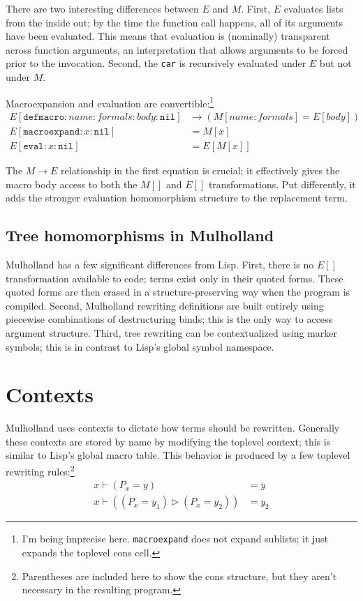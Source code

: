 \documentclass{report}
\begin{document}
    There are two interesting differences between $E$ and $M$. First, $E$ evaluates lists from the inside out; by the time the function call happens, all of its arguments have been evaluated.
    This means that evaluation is (nominally) transparent across function arguments, an interpretation that allows arguments to be forced prior to the invocation. Second, the {\tt car} is
    recursively evaluated under $E$ but not under $M$.

    Macroexpansion and evaluation are convertible:\footnote{I'm being imprecise here. {\tt macroexpand} does not expand sublists; it just expands the toplevel cons cell.}
\begin{align*}
E[\texttt{defmacro}:name:formals:body:\texttt{nil}] & \rightarrow (M[name:formals] = E[body]) \\
E[\texttt{macroexpand}:x:\texttt{nil}]              & = M[x] \\
E[\texttt{eval}:x:\texttt{nil}]                     & = E[M[x]]
\end{align*}

    The $M \rightarrow E$ relationship in the first equation is crucial; it effectively gives the macro body access to both the $M[]$ and $E[]$ transformations. Put differently, it adds the
    stronger evaluation homomorphism structure to the replacement term.

\section{Tree homomorphisms in Mulholland}
    Mulholland has a few significant differences from Lisp. First, there is no $E[]$ transformation available to code; terms exist only in their quoted forms. These quoted forms are then
    erased in a structure-preserving way when the program is compiled. Second, Mulholland rewriting definitions are built entirely using piecewise combinations of destructuring binds; this is
    the only way to access argument structure. Third, tree rewriting can be contextualized using marker symbols; this is in contrast to Lisp's global symbol namespace.

\chapter{Contexts}
  Mulholland uses contexts to dictate how terms should be rewritten. Generally these contexts are stored by name by modifying the toplevel context; this is similar to Lisp's global macro
  table. This behavior is produced by a few toplevel rewriting rules:\footnote{Parentheses are included here to show the cons structure, but they aren't necessary in the resulting program.}
\begin{align*}
x \vdash (P_x = y)                      & = y \\
x \vdash ((P_x = y_1) \rhd (P_x = y_2)) & = y_2
\end{align*}
\end{document}
